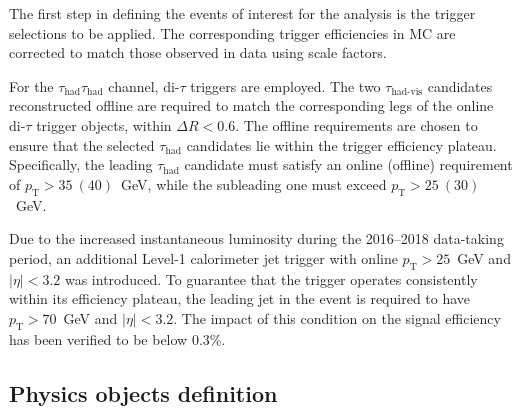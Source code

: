 The first step in defining the events of interest for the analysis is the trigger selections to be applied. The corresponding trigger efficiencies in MC are corrected to match those observed in data using scale factors.  

For the $\tau_{\text{had}}\tau_{\text{had}}$ channel, di-$\tau$ triggers are employed. The two $\tau_{\text{had-vis}}$ candidates reconstructed offline are required to match the corresponding legs of the online di-$\tau$ trigger objects, within $\Delta R < 0.6$. The offline \pt requirements are chosen to ensure that the selected $\tau_{\text{had}}$ candidates lie within the trigger efficiency plateau. Specifically, the leading $\tau_{\text{had}}$ candidate must satisfy an online (offline) requirement of $p_{\text{T}} > 35~(40)$~GeV, while the subleading one must exceed $p_{\text{T}} > 25~(30)$~GeV.  

Due to the increased instantaneous luminosity during the 2016--2018 data-taking period, an additional Level-1 calorimeter jet trigger with online $p_{\text{T}} > 25$~GeV and $|\eta| < 3.2$ was introduced. To guarantee that the trigger operates consistently within its efficiency plateau, the leading jet in the event is required to have $p_{\text{T}} > 70$~GeV and $|\eta| < 3.2$. The impact of this condition on the signal efficiency has been verified to be below $0.3\%$.

\subsection{Physics objects definition}
\label{subsec:object_def}

